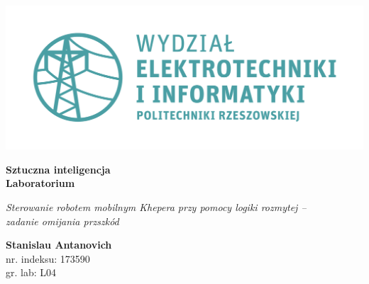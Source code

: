 \documentclass[a4paper, 10pt]{article}
\begin{document}
\begin{titlepage}
\begin{center}
        \includegraphics[scale=0.7]{logo.png}

        \vspace*{4cm}
        \textbf{Sztuczna inteligencja\\ Laboratorium}

        \vspace{1.5cm}
        \textit{Sterowanie robotem mobilnym Khepera przy pomocy logiki rozmytej -- \\zadanie omijania przszkód}

        \vspace{1.5cm}
        \textbf{Stanislau Antanovich}\\
        nr. indeksu: 173590\\
        gr. lab: L04 
\end{center}
\end{titlepage}

\tableofcontents
\listoffigures

\newpage


\end{document}

